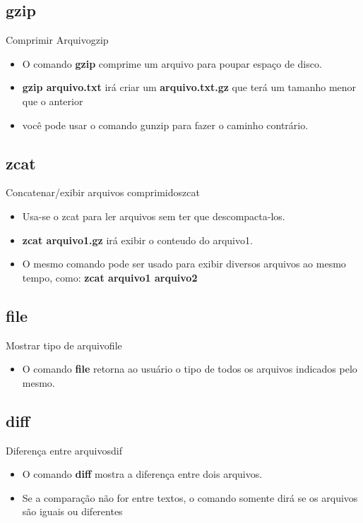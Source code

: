 \documentclass{beamer}
\begin{document}
\subsection{gzip}
\begin{frame}{Comprimir Arquivo}{gzip}
  \begin{itemize}
  \item {O comando \textbf{gzip} comprime um arquivo para poupar espaço de disco.
  } 
    \item{ \textbf{gzip arquivo.txt} irá criar um \textbf{arquivo.txt.gz} que terá um tamanho menor que o anterior}
    \item{você pode usar o comando gunzip para fazer o caminho contrário.
  }
  \end{itemize}
\end{frame}

\subsection{zcat}
\begin{frame}{Concatenar/exibir arquivos comprimidos}{zcat}
  \begin{itemize}
  \item { Usa-se o zcat para ler arquivos sem ter que descompacta-los.
} 
    \item{ \textbf{zcat arquivo1.gz} irá exibir o conteudo do arquivo1.}
    \item{O mesmo comando pode ser usado para exibir diversos arquivos ao mesmo tempo, como: \textbf{zcat arquivo1 arquivo2}}
 
  \end{itemize}
\end{frame}


\subsection{file}
\begin{frame}{Mostrar tipo de arquivo}{file}
  \begin{itemize}
  \item {   
  O comando \textbf{file} retorna ao usuário o tipo de todos os arquivos indicados pelo mesmo.
  } 
  \end{itemize}
\end{frame}

\subsection{diff}
\begin{frame}{Diferença entre arquivos}{dif}
  \begin{itemize}
  \item {   
  O comando \textbf{diff} mostra a diferença entre dois arquivos.
  } 
  \item{Se a comparação não for entre textos, o comando somente dirá se os arquivos são iguais ou diferentes}
  \end{itemize}
\end{frame}
\end{document}
